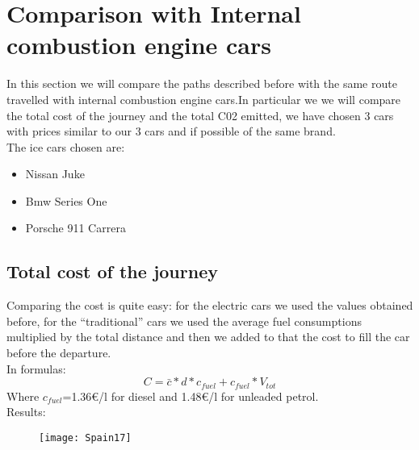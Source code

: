\documentclass{article}
\begin{document}
{}
\newpage
\section{Comparison with Internal combustion engine cars}
In this section we will compare the paths described before with the same route travelled with internal combustion engine cars.In particular we we will compare the total cost of the journey and the total C02 emitted, we have chosen 3 cars with prices similar to our 3 cars and if possible of the same brand.\\
The ice cars chosen are:
\begin{itemize}
\item Nissan Juke
\item Bmw Series One
\item Porsche 911 Carrera
\end{itemize}
\subsection{Total cost of the journey}
Comparing the cost is quite easy: for the electric cars we used the values obtained before, for the “traditional” cars we used the average fuel consumptions multiplied by the total distance and then we added to that the cost to fill the car before the departure.\\
In formulas:
\begin{equation}
C=\bar{c}*d*c_{fuel} + c_{fuel}*V_{tot}
\end{equation}
Where $c_{fuel}$=1.36\euro/l for diesel and 1.48\euro/l for unleaded petrol. \\
Results:
\begin{figure}[H]
{\centering
\texttt{[image: Spain17]}
\caption{}}
\end{figure}
\newpage
\end{document}
